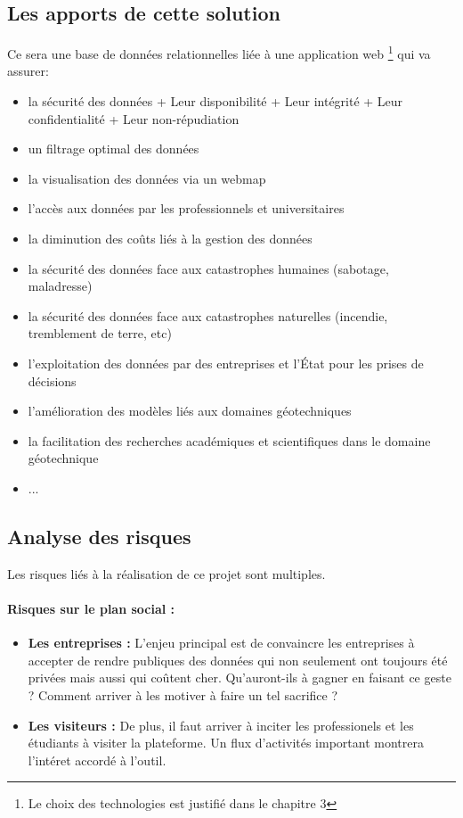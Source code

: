         \subsection{Les apports de cette solution}
            Ce sera une base de données relationnelles liée à une application web
            \footnote{Le choix des technologies est justifié dans le chapitre 3} 
            qui va assurer:
            \begin{itemize}
                \item la sécurité des données
                    \subitem+ Leur disponibilité
                    \subitem+ Leur intégrité
                    \subitem+ Leur confidentialité
                    \subitem+ Leur non-répudiation
                \item un filtrage optimal des données
                \item la visualisation des données via un webmap
                \item l'accès aux données par les professionnels et universitaires
                \item la diminution des coûts liés à la gestion des données
                \item la sécurité des données face aux catastrophes humaines (sabotage, maladresse)
                \item la sécurité des données face aux catastrophes naturelles (incendie, tremblement de terre, etc)
                \item l'exploitation des données par des entreprises et l'État pour les prises de décisions
                \item l'amélioration des modèles liés aux domaines géotechniques
                \item la facilitation des recherches académiques et scientifiques dans le domaine géotechnique
                \item ...
            \end{itemize}
        \subsection{Analyse des risques}
        Les risques liés à la réalisation de ce projet sont multiples.
        \paragraph{Risques sur le plan social :}
        \begin{itemize}
            \item \textbf{Les entreprises :}
            L'enjeu principal est de convaincre les entreprises à accepter de rendre publiques des 
            données qui non seulement ont toujours été privées mais aussi qui coûtent cher. 
            Qu'auront-ils à gagner en faisant ce geste ? 
            Comment arriver à les motiver à faire un tel sacrifice ?
            \item \textbf{Les visiteurs :}
            De plus, il faut arriver à inciter les professionels et les étudiants à
            visiter la plateforme. Un flux d'activités important montrera l'intéret accordé à l'outil.
        \end{itemize}
        

